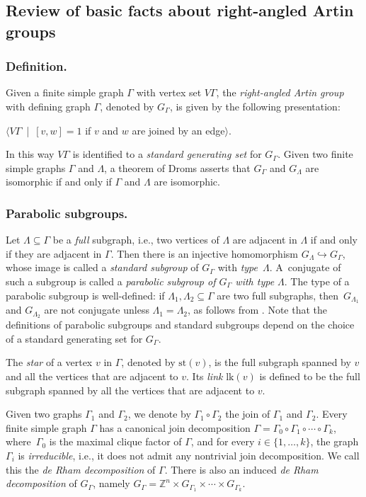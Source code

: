 \documentclass[11pt]{article}
\newcommand{\ie}{i.e.,\xspace}
\newcommand{\Subsection}{\subsection}
\numberwithin{equation}{section}
\theoremstyle{plain}
\theoremstyle{definition}
\newcommand{\lk}{\mathrm{lk}}
\newcommand{\st}{\mathrm{st}}
\begin{document}
\Subsection{Review of basic facts about right-angled Artin groups}\label{sec:review}

\subsubsection*{Definition.} Given a finite simple graph $\Gamma$ with vertex set $V\Gamma$, the \emph{right-angled Artin group} with defining graph $\Gamma$, denoted by $G_\Gamma$, is given by the following presentation:
\begin{center}
$\langle V\Gamma$\ |\ $[v,w]=1$ if $v$ and $w$ are joined by an edge$\rangle$.
\end{center}
In this way $V\Gamma$ is identified to a \textit{standard generating set} for $G_\Gamma$. Given two finite simple graphs $\Gamma$ and $\Lambda$, a theorem of Droms \cite{Dro} asserts that $G_\Gamma$ and $G_\Lambda$ are isomorphic if and only if $\Gamma$ and $\Lambda$ are isomorphic.

\subsubsection*{Parabolic subgroups.} Let $\Lambda\!\subseteq\!\Gamma$ be a \emph{full} subgraph, \ie two vertices of $\Lambda$ are adja\-cent in $\Lambda$ if and only if they are adjacent in $\Gamma$. Then there is an injective homomorphism $G_{\Lambda}\hookrightarrow G_{\Gamma}$, whose image is called a \emph{standard subgroup} of $G_{\Gamma}$ with \emph{type}~$\Lambda$. A~conjugate of such a subgroup is called a \emph{parabolic subgroup of $G_\Gamma$ with type $\Lambda$}. The type of a parabolic subgroup is well-defined: if $\Lambda_1,\Lambda_2\subseteq\Gamma$ are two full subgraphs, then~$G_{\Lambda_1}$ and $G_{\Lambda_2}$ are not conjugate unless $\Lambda_1=\Lambda_2$, as follows from \hbox{\cite[Prop.\,2.2]{charney2007automorphisms}}. Note that the definitions of parabolic subgroups and standard subgroups depend on the choice of a standard generating set for $G_\Gamma$.

The \emph{star} of a vertex $v$ in $\Gamma$, denoted by $\st(v)$, is the full subgraph spanned by $v$ and all the vertices that are adjacent to $v$. Its \emph{link} $\lk(v)$ is defined to be the full subgraph spanned by all the vertices that are adjacent to $v$.

Given two graphs $\Gamma_1$ and $\Gamma_2$, we denote by $\Gamma_1\circ \Gamma_2$ the join of $\Gamma_1$ and $\Gamma_2$. Every finite simple graph $\Gamma$ has a canonical join decomposition $\Gamma=\Gamma_0\circ \Gamma_1\circ\cdots\circ\Gamma_k$, where~$\Gamma_0$ is the maximal clique factor of $\Gamma$, and for every $i\in\{1,\dots,k\}$, the graph $\Gamma_i$ is \emph{irreducible}, \ie it does not admit any nontrivial join decomposition. We call this the \emph{de Rham decomposition} of $\Gamma$. There is also an induced \emph{de Rham decomposition} of $G_\Gamma$, namely $G_\Gamma=\mathbb Z^n\times G_{\Gamma_1}\times\cdots\times G_{\Gamma_k}$.
\end{document}
